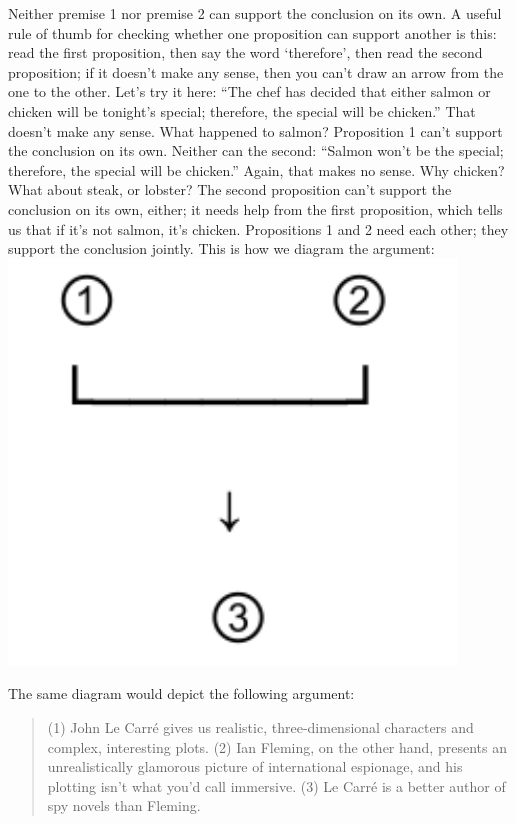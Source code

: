 Neither premise 1 nor premise 2 can support the conclusion on its own. A useful rule of thumb for
checking whether one proposition can support another is this: read the first proposition, then say
the word `therefore', then read the second proposition; if it doesn't make any sense, then you can't
draw an arrow from the one to the other. Let's try it here: ``The chef has decided that either salmon
or chicken will be tonight's special; therefore, the special will be chicken.'' That doesn't make any
sense. What happened to salmon? Proposition 1 can't support the conclusion on its own. Neither
can the second: ``Salmon won't be the special; therefore, the special will be chicken.'' Again, that
makes no sense. Why chicken? What about steak, or lobster? The second proposition can't support
the conclusion on its own, either; it needs help from the first proposition, which tells us that if it's
not salmon, it's chicken. Propositions 1 and 2 need each other; they support the conclusion jointly.
This is how we diagram the argument: \\

\includegraphics[scale=.49]{diagram3.pdf}

The same diagram would depict the following argument:

\begin{quote}
(1) John Le Carr\'e gives us realistic, three-dimensional characters and complex, interesting
plots. (2) Ian Fleming, on the other hand, presents an unrealistically glamorous picture of
international espionage, and his plotting isn't what you'd call immersive. (3) Le Carr\'e is a
better author of spy novels than Fleming.
\end{quote}

